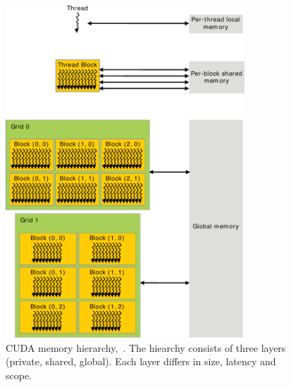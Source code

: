 \begin{figure}[!htbp]
  \centering
  \includegraphics[width=0.8\textwidth]{img/memory_hierarchy.pdf}
  \caption[CUDA memory hierarchy.]{CUDA memory hierarchy,~\cite{CudaProgrammingGuide}. The hiearchy consists of three layers (private, shared, global). Each layer differs in size, latency and scope.}
  \label{fig:memory_hierarchy}
\end{figure}
